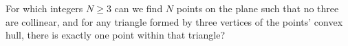 For which integers $N\ge 3$ can we find $N$ points on the plane such that no three are collinear, and for any triangle formed by three vertices of the points’ convex hull, there is exactly one point within that triangle?